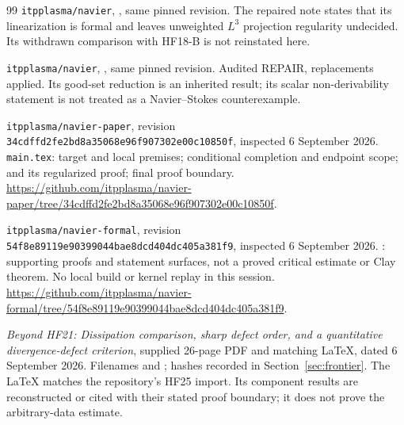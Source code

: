 \documentclass[11pt,a4paper]{article}
\theoremstyle{definition}\newtheorem{definition}[theorem]{Definition}
\theoremstyle{remark}\newtheorem{remark}[theorem]{Remark}
\newcommand{\repo}[1]{{\small\texttt{#1}}}
\numberwithin{equation}{section}
\begin{document}
\begin{thebibliography}{99}
\repo{itpplasma/navier}, , same pinned revision. The repaired note states that its linearization is formal and leaves unweighted $L^3$ projection regularity undecided. Its withdrawn comparison with HF18-B is not reinstated here.

\repo{itpplasma/navier}, , same pinned revision. Audited REPAIR, replacements applied. Its good-set reduction is an inherited result; its scalar non-derivability statement is not treated as a Navier--Stokes counterexample.

\repo{itpplasma/navier-paper}, revision \repo{34cdffd2fe2bd8a35068e96f907302e00c10850f}, inspected 6 September 2026. \repo{main.tex}: target and local premises; conditional completion and endpoint scope;  and its regularized proof; final proof boundary. \url{https://github.com/itpplasma/navier-paper/tree/34cdffd2fe2bd8a35068e96f907302e00c10850f}.

\repo{itpplasma/navier-formal}, revision \repo{54f8e89119e90399044bae8dcd404dc405a381f9}, inspected 6 September 2026. : supporting proofs and statement surfaces, not a proved critical estimate or Clay theorem. No local build or kernel replay in this session. \url{https://github.com/itpplasma/navier-formal/tree/54f8e89119e90399044bae8dcd404dc405a381f9}.

\emph{Beyond HF21: Dissipation comparison, sharp defect order, and a quantitative divergence-defect criterion}, supplied 26-page PDF and matching LaTeX, dated 6 September 2026. Filenames  and ; hashes recorded in Section~\ref{sec:frontier}. The LaTeX matches the repository's HF25 import. Its component results are reconstructed or cited with their stated proof boundary; it does not prove the arbitrary-data estimate.
\end{thebibliography}\endgroup
\end{document}
